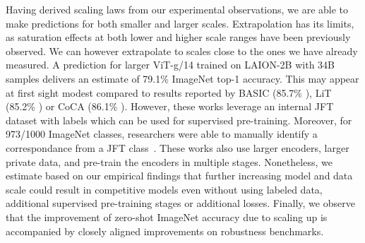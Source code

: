 \documentclass[11pt,table]{article}
\newcommand{\citep}{\cite}
\begin{document}
Having derived scaling laws from our experimental observations, we are able to make predictions for both smaller and larger scales. Extrapolation has its limits, as saturation effects at both lower and higher scale ranges have been previously observed. We can however extrapolate to scales close to the ones we have already measured. A prediction for larger ViT-g/14 trained on LAION-2B with 34B samples delivers an estimate of 79.1\% ImageNet top-1 accuracy. This may appear at first sight modest compared to results reported by BASIC (85.7\% \citep{basic}), LiT (85.2\% \citep{zhai2021lit}) or CoCA (86.1\% \citep{yu2022coca}).
However, these works leverage an internal JFT dataset with labels which can be used for supervised pre-training. Moreover, for 973/1000 ImageNet classes, researchers were able to manually identify a correspondance from a JFT class~\cite{wortsman2022robust}. 
These works also use larger encoders, larger private data, and pre-train the encoders in multiple stages. Nonetheless, we estimate based on our empirical findings that further increasing model and data scale could result in competitive models even without using labeled data, additional supervised pre-training stages or additional losses.
Finally, we observe that the improvement of zero-shot ImageNet accuracy due to scaling up is accompanied by closely aligned improvements on robustness benchmarks.


\end{document}
